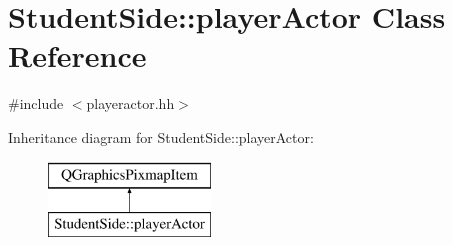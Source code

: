 \hypertarget{class_student_side_1_1player_actor}{\section{Student\-Side\-:\-:player\-Actor Class Reference}
\label{class_student_side_1_1player_actor}
}


{\ttfamily \#include $<$playeractor.\-hh$>$}

Inheritance diagram for Student\-Side\-:\-:player\-Actor\-:\begin{figure}[H]
\begin{center}
\leavevmode
\includegraphics[height=2.000000cm]{class_student_side_1_1player_actor}
\end{center}
\end{figure}
